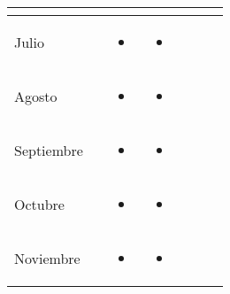 \documentclass[landscape, a4paper, 10pt]{article}
\newcommand{\smallcellwidth}{0.7in}
\newcommand{\normalcellwidth}{1.2in}
\newcommand{\bigcellwidth}{2.0in}
\begin{document}
\begin{longtable}{|m{\smallcellwidth}|p{\normalcellwidth}|p{\bigcellwidth}|p{\bigcellwidth}|p{\normalcellwidth}|p{\normalcellwidth}|p{\normalcellwidth}|}
\begin{itemize}
 		\end{itemize} &
		 &
		 &
		 \\
		\hline
		Julio &
		 &
		\begin{itemize}
			\item 
		\end{itemize} &
		\begin{itemize}
			\item 
 		\end{itemize} &
		 &
		 &
		 \\
		\hline
		Agosto &
		 &
		\begin{itemize}
			\item 
		\end{itemize} &
		\begin{itemize}
			\item 
 		\end{itemize} &
		 &
		 &
		 \\
		\hline
		Septiembre &
		 &
		\begin{itemize}
			\item 
		\end{itemize} &
		\begin{itemize}
			\item 
 		\end{itemize} &
		 &
		 &
		 \\
		\hline
		Octubre &
		 &
		\begin{itemize}
			\item 
		\end{itemize} &
		\begin{itemize}
			\item 
 		\end{itemize} &
		 &
		 &
		\\
		\hline
		Noviembre &
		 &
		\begin{itemize}
			\item 
		\end{itemize} &
		\begin{itemize}
			\item 
 		\end{itemize} &
		 &
		 &
		 \\
		\hline

	\end{longtable}
	\pagebreak[4]
\end{document}
